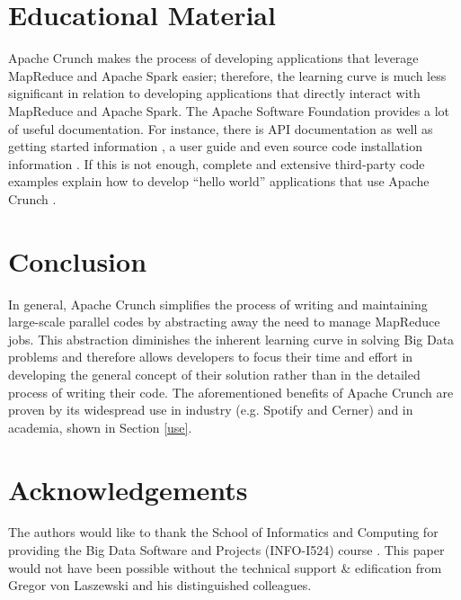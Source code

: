 \documentclass[9pt,twocolumn,twoside]{../../styles/osajnl}
\begin{document}
\section{Educational Material} \label{educational}
Apache Crunch makes the process of developing applications that
leverage MapReduce and Apache Spark easier; therefore, the learning
curve is much less significant in relation to developing applications
that directly interact with MapReduce and Apache Spark. The Apache
Software Foundation provides a lot of useful documentation. For
instance, there is API documentation \cite{www-apache-docs} as well as
getting started information \cite{www-crunch-started}, a user guide
\cite{www-crunch-user-guide} and even source code installation
information \cite{www-crunch-git}. If this is not enough, complete and
extensive third-party code examples explain how to develop ``hello
world'' applications that use Apache Crunch
\cite{www-crunch-tutorial}.

\section{Conclusion} \label{conclusion}
In general, Apache Crunch simplifies the process of writing and
maintaining large-scale parallel codes by abstracting away the need to
manage MapReduce jobs. This abstraction diminishes the inherent
learning curve in solving Big Data problems and therefore allows
developers to focus their time and effort in developing the general
concept of their solution rather than in the detailed process of
writing their code. The aforementioned benefits of Apache Crunch are
proven by its widespread use in industry (e.g. Spotify and Cerner) and
in academia, shown in Section \ref{use}.

\section*{Acknowledgements}
The authors would like to thank the School of Informatics and
Computing for providing the Big Data Software and Projects (INFO-I524)
course \cite{www-i524}. This paper would not have been possible
without the technical support \& edification from Gregor von Laszewski
and his distinguished colleagues.
\end{document}
